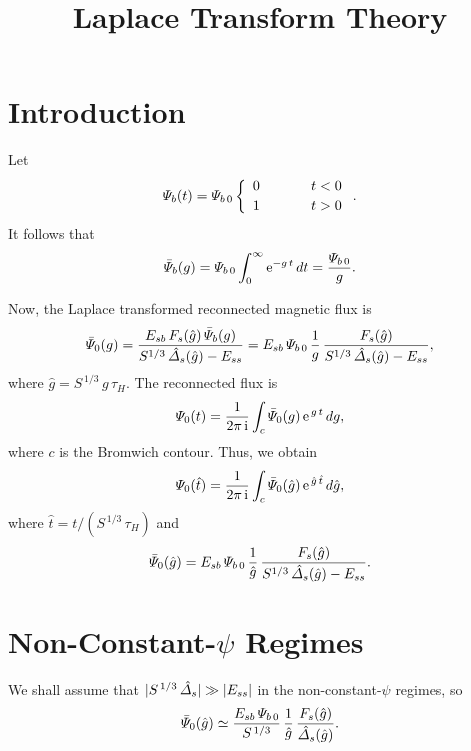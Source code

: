 \documentclass[titlepage=false,12pt]{article}
\begin{document}
\title{Laplace Transform Theory}
\date{}
\maketitle

\section{Introduction}
Let
\begin{equation}
{\mit\Psi}_b(t) = {\mit\Psi}_{b\,0}\left\{\begin{array}{ccc} 0&~~~~~&t<0\\[0.5ex]
1&&t>0\end{array}\right..
\end{equation}
It follows that
\begin{equation}
\bar{\mit\Psi}_b(g) = {\mit\Psi}_{b\,0} \int_0^\infty {\rm e}^{-g\,t}\,dt = \frac{{\mit\Psi}_{b\,0}}{g}.
\end{equation}

Now, the Laplace transformed reconnected magnetic flux is
\begin{equation}
\bar{\mit\Psi}_0(g)=\frac{E_{sb}\,F_s(\hat{g})\,\bar{\mit\Psi}_b(g)}{S^{1/3}\,\hat{\mit\Delta}_s(\hat{g})-E_{ss}}
= E_{sb}\,{\mit\Psi}_{b\,0}\,\frac{1}{g}\,\frac{F_s(\hat{g})}{S^{1/3}\,\hat{\mit\Delta}_s(\hat{g})-E_{ss}},
\end{equation}
where $\hat{g} = S^{\,1/3}\,g\,\tau_H$. The reconnected flux is
\begin{equation}
{\mit\Psi}_0(t) = \frac{1}{2\pi\,{\rm i}}\int_c\bar{\mit\Psi}_0(g)\,{\rm e}^{\,g\,t}\,dg,
\end{equation}
where $c$ is the Bromwich contour. Thus, we obtain
\begin{equation}
{\mit\Psi}_0(\hat{t}) = \frac{1}{2\pi\,{\rm i}}\int_c\bar{\mit\Psi}_0(\hat{g})\,{\rm e}^{\,\hat{g}\,\hat{t}}\,d\hat{g},
\end{equation}
where $\hat{t}=t/(S^{\,1/3}\,\tau_H)$ and
\begin{equation}
\bar{\mit\Psi}_0(\hat{g})
= E_{sb}\,{\mit\Psi}_{b\,0}\,\frac{1}{\hat{g}}\,\frac{F_s(\hat{g})}{S^{1/3}\,\hat{\mit\Delta}_s(\hat{g})-E_{ss}}.
\end{equation}

\section{Non-Constant-$\psi$ Regimes}
We shall assume that $|S^{\,1/3}\,\hat{\mit\Delta}_s|\gg |E_{ss}|$ in the non-constant-$\psi$ regimes, so
\begin{equation}
\bar{\mit\Psi}_0(\hat{g})
\simeq \frac{E_{sb}\,{\mit\Psi}_{b\,0}}{S^{\,1/3}}\,\frac{1}{\hat{g}}\,\frac{F_s(\hat{g})}{\hat{\mit\Delta}_s(\hat{g})}.
\end{equation}
\end{document}
